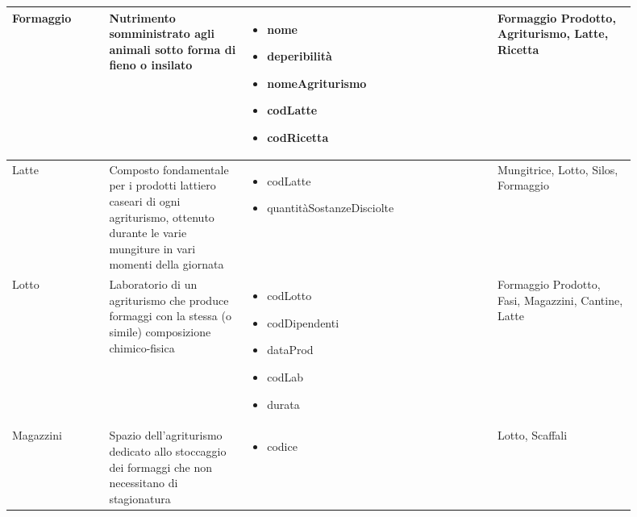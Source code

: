 \documentclass[12pt,a4paper]{article}
\begin{document}
\begin{center}
\begin{longtable}{|p{0.14\linewidth}|p{0.20\linewidth}|p{0.36\linewidth}|p{0.20\linewidth}|}
\hline
Formaggio				 	&  Nutrimento somministrato agli animali sotto forma di fieno o insilato 
					& \begin{itemize}
						\setlength{\itemindent}{-1em}
						\vspace{-25pt}
						\setlength\itemsep{-0.25em}
						\item nome
						\item deperibilità
						\item nomeAgriturismo
						\item codLatte
						\item codRicetta
					\end{itemize}
					&  Formaggio Prodotto, Agriturismo, Latte, Ricetta  \\ 

\hline
Latte				 	&  Composto fondamentale per i prodotti lattiero caseari di ogni agriturismo, ottenuto durante le varie mungiture in vari momenti della giornata 
					& \begin{itemize}
						\setlength{\itemindent}{-1em}
						\vspace{-25pt}
						\setlength\itemsep{-0.25em}
						\item codLatte
						\item quantitàSostanzeDi\-sciolte
					\end{itemize}
					&  Mungitrice, Lotto, Silos, Formaggio  \\ 

\hline
Lotto				 	&  Laboratorio di un agriturismo che produce formaggi con la stessa (o simile) composizione chimico-fisica 
					& \begin{itemize}
						\setlength{\itemindent}{-1em}
						\vspace{-25pt}
						\setlength\itemsep{-0.25em}
						\item codLotto
						\item codDipendenti
						\item dataProd
						\item codLab
						\item durata
					\end{itemize}
					&  Formaggio Prodotto, Fasi, Magazzini, Cantine, Latte  \\ 

\hline
Magazzini				 	&  Spazio dell'agriturismo dedicato allo stoccaggio dei formaggi che non necessitano di stagionatura 
					& \begin{itemize}
						\setlength{\itemindent}{-1em}
						\vspace{-25pt}
						\setlength\itemsep{-0.25em}
						\item codice
					\end{itemize}
					&  Lotto, Scaffali  \\ 


\end{longtable}
\end{center}
\end{document}
